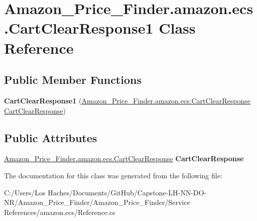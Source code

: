 \hypertarget{class_amazon___price___finder_1_1amazon_1_1ecs_1_1_cart_clear_response1}{\section{Amazon\-\_\-\-Price\-\_\-\-Finder.\-amazon.\-ecs.\-Cart\-Clear\-Response1 Class Reference}
\label{class_amazon___price___finder_1_1amazon_1_1ecs_1_1_cart_clear_response1}
}
\subsection*{Public Member Functions}
\begin{DoxyCompactItemize}
\item 
\hypertarget{class_amazon___price___finder_1_1amazon_1_1ecs_1_1_cart_clear_response1_a6c5a8abfe24241cbd92c2c42f3b5f7cb}{{\bfseries Cart\-Clear\-Response1} (\hyperlink{class_amazon___price___finder_1_1amazon_1_1ecs_1_1_cart_clear_response}{Amazon\-\_\-\-Price\-\_\-\-Finder.\-amazon.\-ecs.\-Cart\-Clear\-Response} \hyperlink{class_amazon___price___finder_1_1amazon_1_1ecs_1_1_cart_clear_response}{Cart\-Clear\-Response})}\label{class_amazon___price___finder_1_1amazon_1_1ecs_1_1_cart_clear_response1_a6c5a8abfe24241cbd92c2c42f3b5f7cb}

\end{DoxyCompactItemize}
\subsection*{Public Attributes}
\begin{DoxyCompactItemize}
\item 
\hypertarget{class_amazon___price___finder_1_1amazon_1_1ecs_1_1_cart_clear_response1_a58eea0f83f1629149ae538196b83efd2}{\hyperlink{class_amazon___price___finder_1_1amazon_1_1ecs_1_1_cart_clear_response}{Amazon\-\_\-\-Price\-\_\-\-Finder.\-amazon.\-ecs.\-Cart\-Clear\-Response} {\bfseries Cart\-Clear\-Response}}\label{class_amazon___price___finder_1_1amazon_1_1ecs_1_1_cart_clear_response1_a58eea0f83f1629149ae538196b83efd2}

\end{DoxyCompactItemize}


The documentation for this class was generated from the following file\-:\begin{DoxyCompactItemize}
\item 
C\-:/\-Users/\-Los Haches/\-Documents/\-Git\-Hub/\-Capstone-\/\-L\-H-\/\-N\-N-\/\-D\-O-\/\-N\-R/\-Amazon\-\_\-\-Price\-\_\-\-Finder/\-Amazon\-\_\-\-Price\-\_\-\-Finder/\-Service References/amazon.\-ecs/Reference.\-cs\end{DoxyCompactItemize}
